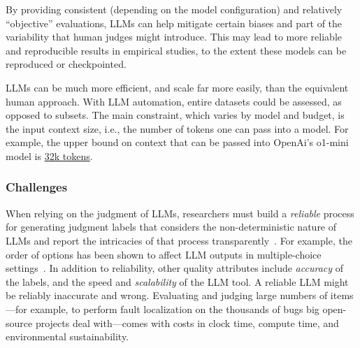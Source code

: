 By providing consistent (depending on the model configuration) and relatively ``objective'' evaluations, LLMs can help mitigate certain biases and part of the variability that human judges might introduce.
This may lead to more reliable and reproducible results in empirical studies, to the extent these models can be reproduced or checkpointed. %

LLMs can be much more efficient, and scale far more easily, than the equivalent human approach. With LLM automation, entire datasets could be assessed, as opposed to subsets. The main constraint, which varies by model and budget, is the input context size, i.e., the number of tokens one can pass into a model. For example, the upper bound on context that can be passed into OpenAi's \textsf{o1-mini} model is \href{https://help.openai.com/en/articles/9855712-openai-o1-models-faq-chatgpt-enterprise-and-edu}{32k tokens}. 

\subsubsection{Challenges}

When relying on the judgment of LLMs, researchers must build a \textit{reliable} process for generating judgment labels that considers the non-deterministic nature of LLMs and report the intricacies of that process transparently~\cite{DBLP:journals/corr/abs-2412-12509}. For example, the order of options has been shown to affect LLM outputs in multiple-choice settings~\cite{DBLP:conf/naacl/PezeshkpourH24}. 
In addition to reliability, other quality attributes include \textit{accuracy} of the labels, and the speed and \textit{scalability} of the LLM tool. 
A reliable LLM might be reliably inaccurate and wrong. 
Evaluating and judging large numbers of items---for example, to perform fault localization on the thousands of bugs big open-source projects deal with---comes with costs in clock time, compute time, and environmental sustainability.

